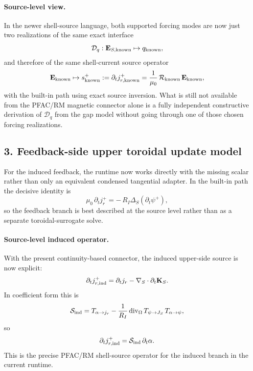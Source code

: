 \documentclass[11pt,a4paper]{article}
\begin{document}
\paragraph{Source-level view.}
In the newer shell-source language, both supported forcing modes are now just
two realizations of the same exact interface
\[
\mathcal D_q:\mathbf E_{S,\rm known}\mapsto q_{\rm known},
\]
and therefore of the same shell-current source operator
\begin{equation}
\mathbf E_{\rm known}
\mapsto
s_{\rm known}^+
:=
\partial_t j_{r,\rm known}^+
=
\frac{1}{\mu_0}\,\mathcal R_{\rm known}\,\mathbf E_{\rm known},
\label{eq:built_in_known_source_operator}
\end{equation}
with the built-in  path using exact
source inversion. What is still not available from the PFAC/RM magnetic connector
alone is a fully independent constructive derivation of \(\mathcal D_q\) from
the gap model without going through one of those chosen forcing realizations.

\subsection*{3. Feedback-side upper toroidal update model}

For the induced feedback, the runtime now works directly with the missing
scalar rather than only an equivalent condensed tangential adapter. In the
built-in path the decisive identity is
\[
\mu_0\,\partial_t j_r^+
=
-\,R_I \Delta_S(\partial_t\psi^+),
\]
so the feedback branch is best described at the source level rather than as a
separate toroidal-surrogate solve.

\paragraph{Source-level induced operator.}
With the present continuity-based connector, the induced upper-side source is
now explicit:
\begin{equation}
\partial_t j_{r,\rm ind}^+
=
\partial_t j_r - \nabla_S\cdot \partial_t\mathbf K_S.
\label{eq:continuity_induced_source_shell}
\end{equation}
In coefficient form this is
\begin{equation}
\mathcal S_{\rm ind}
=
T_{\alpha\to j_r}
-\frac{1}{R_I}\,\mathrm{div}_\Omega\,
T_{\psi\to J_S}\,
T_{\alpha\to\psi},
\label{eq:continuity_induced_source_operator}
\end{equation}
so
\[
\partial_t j_{r,\rm ind}^+
=
\mathcal S_{\rm ind}\,\partial_t\alpha.
\]
This is the precise PFAC/RM shell-source operator for the induced branch in
the current runtime.
\end{document}
